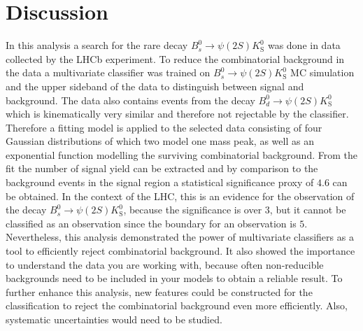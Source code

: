 \section{Discussion}
\label{sec:Diskussion}
In this analysis a search for the rare decay $B^0_s \to \psi(2S)K^0_\mathrm{S}$ was done in data collected by the LHCb experiment. To reduce the combinatorial background in the data a multivariate classifier was trained on $B^0_s \to \psi(2S)K^0_\mathrm{S}$ MC simulation and the upper sideband of the data to distinguish between signal and background. The data also contains events from the decay $B^0_d \to \psi(2S)K^0_\mathrm{S}$ which is kinematically very similar and therefore not rejectable by the classifier.
Therefore a fitting model is applied to the selected data consisting of four Gaussian distributions of which two model one mass peak, as well as an exponential function modelling the surviving combinatorial background. From the fit the number of signal yield can be extracted and by comparison to the background events in the signal region a statistical significance proxy of $\num{4.6}$ can be obtained.
In the context of the LHC, this is an evidence for the observation of the decay $B^0_s \to \psi(2S)K^0_\mathrm{S}$, because the significance is over $\num{3}$, but it cannot be classified as an observation since the boundary for an observation is $\num{5}$.
Nevertheless, this analysis demonstrated the power of multivariate classifiers as a tool to efficiently reject combinatorial background.
It also showed the importance to understand the data you are working with, because often non-reducible backgrounds need to be included in your models to obtain a reliable result.
To further enhance this analysis, new features could be constructed for the classification to reject the combinatorial background even more efficiently. Also, systematic uncertainties would need to be studied.
